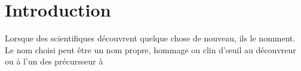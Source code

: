 \section{Introduction}

Lorsque des scientifiques découvrent quelque chose de nouveau, ils le nomment. Le nom choisi peut être un nom propre, hommage ou clin d'œuil au découvreur ou à l'un des précursseur à 

